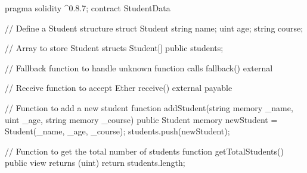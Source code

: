pragma solidity ^0.8.7;
contract StudentData {
    // Define a Student structure
    struct Student {
        string name;
        uint age;
        string course;
    }

    // Array to store Student structs
    Student[] public students;

    // Fallback function to handle unknown function calls
    fallback() external {}

    // Receive function to accept Ether
    receive() external payable {}

    // Function to add a new student
    function addStudent(string memory _name, uint _age, string memory _course) public {
        Student memory newStudent = Student(_name, _age, _course);
        students.push(newStudent);
    }

    // Function to get the total number of students
    function getTotalStudents() public view returns (uint) {
        return students.length;
    }
}

